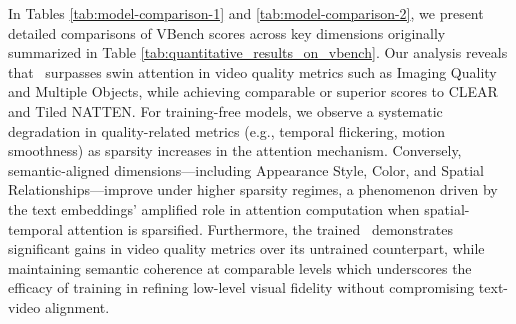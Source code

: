In Tables \ref{tab:model-comparison-1} and \ref{tab:model-comparison-2}, we present detailed comparisons of VBench scores across key dimensions originally summarized in Table \ref{tab:quantitative_results_on_vbench}. Our analysis reveals that \methodnameshort\  surpasses swin attention in video quality metrics such as Imaging Quality and Multiple Objects, while achieving comparable or superior scores to CLEAR and Tiled NATTEN. For training-free models, we observe a systematic degradation in quality-related metrics (e.g., temporal flickering, motion smoothness) as sparsity increases in the \methodnameshort{} attention mechanism. Conversely, semantic-aligned dimensions—including Appearance Style, Color, and Spatial Relationships—improve under higher sparsity regimes, a phenomenon driven by the text embeddings’ amplified role in attention computation when spatial-temporal attention is sparsified. Furthermore, the trained \methodnameshort\ demonstrates significant gains in video quality metrics over its untrained counterpart, while maintaining semantic coherence at comparable levels which underscores the efficacy of training in refining low-level visual fidelity without compromising text-video alignment.

